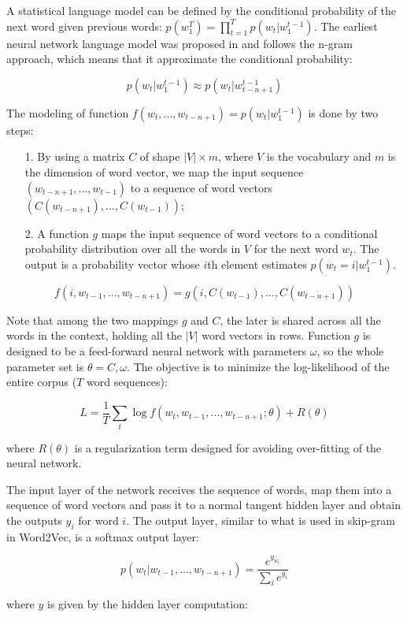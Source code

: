 A statistical language model can be defined by the conditional probability of the next word given previous words: $p(w_1^T) = \prod_{t=1}^T p(w_t | w_1^{t-1})$. The earliest neural network language model was proposed in \cite{bengio2000a} and follows the n-gram approach, which means that it approximate the conditional probability:

$$p(w_t | w_1^{t-1}) \approx p(w_t | w_{t-n+1}^{t-1})$$

The modeling of function $f(w_t,..., w_{t-n+1}) = p(w_t | w_1^{t-1})$ is done by two steps:

\begin{itemize}
    \item[1.] By using a matrix $C$ of shape $|V|\times m$, where $V$ is the vocabulary and $m$ is the dimension of word vector, we map the input sequence $(w_{t-n+1}, ..., w_{t-1})$ to a sequence of word vectors $(C(w_{t-n+1}), ..., C(w_{t-1}))$;
    \item[2.] A function $g$ maps the input sequence of word vectors to a conditional probability distribution over all the words in $V$ for the next word $w_t$. The output is a probability vector whose $i$th element estimates $p(w_t=i|w_1^{t-1})$.
\end{itemize}
$$f(i, w_{t-1}, ..., w_{t-n+1}) = g(i, C(w_{t-1}), ..., C(w_{t-n+1}))$$

Note that among the two mappings $g$ and $C$, the later is shared across all the words in the context, holding all the $|V|$ word vectors in rows. Function $g$ is designed to be a feed-forward neural network with parameters $\omega$, so the whole parameter set is $\theta={C, \omega}$. The objective is to minimize the log-likelihood of the entire corpus ($T$ word sequences):

$$L=\frac{1}{T} \sum_t \log f(w_t, w_{t-1}, ..., w_{t-n+1}; \theta) + R(\theta)$$

where $R(\theta)$ is a regularization term designed for avoiding over-fitting of the neural network. 

The input layer of the network receives the sequence of words, map them into a sequence of word vectors and pass it to a normal tangent hidden layer and obtain the outputs $y_i$ for word $i$. The output layer, similar to what is used in skip-gram in Word2Vec, is a softmax output layer:

$$p(w_t | w_{t-1}, ..., w_{t-n+1}) = \frac{e^{y_{w_t}}}{\sum_i e^{y_i}}$$

where $y$ is given by the hidden layer computation:

